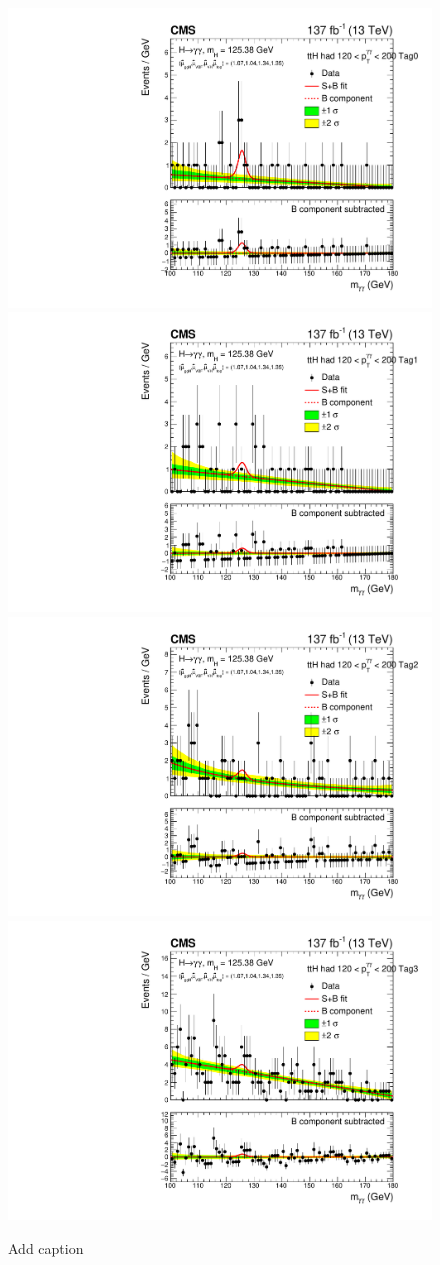 \begin{figure}[htbp]
  \includegraphics[width=.32\linewidth]{Figures/app_sb_models/RECO_TTH_HAD_PTH_120_200_Tag0_CMS_hgg_mass.pdf}
  \includegraphics[width=.32\linewidth]{Figures/app_sb_models/RECO_TTH_HAD_PTH_120_200_Tag1_CMS_hgg_mass.pdf}
  \includegraphics[width=.32\linewidth]{Figures/app_sb_models/RECO_TTH_HAD_PTH_120_200_Tag2_CMS_hgg_mass.pdf}
  \includegraphics[width=.32\linewidth]{Figures/app_sb_models/RECO_TTH_HAD_PTH_120_200_Tag3_CMS_hgg_mass.pdf}
  \caption[Observed diphoton mass distributions]
  {
    Add caption
  }
  \label{fig:diphoton_mass_5}
\end{figure}

